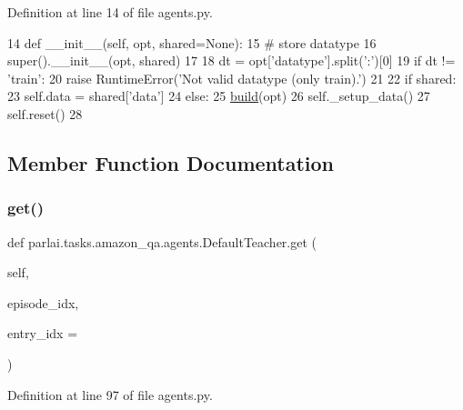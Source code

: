 Definition at line 14 of file agents.\+py.


\begin{DoxyCode}
14     \textcolor{keyword}{def }\_\_init\_\_(self, opt, shared=None):
15         \textcolor{comment}{# store datatype}
16         super().\_\_init\_\_(opt, shared)
17 
18         dt = opt[\textcolor{stringliteral}{'datatype'}].split(\textcolor{stringliteral}{':'})[0]
19         \textcolor{keywordflow}{if} dt != \textcolor{stringliteral}{'train'}:
20             \textcolor{keywordflow}{raise} RuntimeError(\textcolor{stringliteral}{'Not valid datatype (only train).'})
21 
22         \textcolor{keywordflow}{if} shared:
23             self.data = shared[\textcolor{stringliteral}{'data'}]
24         \textcolor{keywordflow}{else}:
25             \hyperlink{namespaceparlai_1_1mturk_1_1tasks_1_1talkthewalk_1_1download_a8c0fbb9b6dfe127cb8c1bd6e7c4e33fd}{build}(opt)
26             self.\_setup\_data()
27         self.reset()
28 
\end{DoxyCode}


\subsection{Member Function Documentation}
\mbox{\label{classparlai_1_1tasks_1_1amazon__qa_1_1agents_1_1DefaultTeacher_ab7d01dd226a50cf520bd7de7a523f3e0}} 
\subsubsection{\texorpdfstring{get()}{get()}}
{\footnotesize\ttfamily def parlai.\+tasks.\+amazon\+\_\+qa.\+agents.\+Default\+Teacher.\+get (\begin{DoxyParamCaption}\item[{}]{self,  }\item[{}]{episode\+\_\+idx,  }\item[{}]{entry\+\_\+idx = {} }\end{DoxyParamCaption})}



Definition at line 97 of file agents.\+py.


